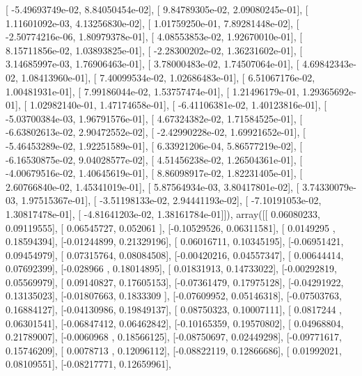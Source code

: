 \documentclass{article}
\begin{document}
       [ -5.49693749e-02,   8.84050454e-02],
       [  9.84789305e-02,   2.09080245e-01],
       [  1.11601092e-03,   4.13256830e-02],
       [  1.01759250e-01,   7.89281448e-02],
       [ -2.50774216e-06,   1.80979378e-01],
       [  4.08553853e-02,   1.92670010e-01],
       [  8.15711856e-02,   1.03893825e-01],
       [ -2.28300202e-02,   1.36231602e-01],
       [  3.14685997e-03,   1.76906463e-01],
       [  3.78000483e-02,   1.74507064e-01],
       [  4.69842343e-02,   1.08413960e-01],
       [  7.40099534e-02,   1.02686483e-01],
       [  6.51067176e-02,   1.00481931e-01],
       [  7.99186044e-02,   1.53757474e-01],
       [  1.21496179e-01,   1.29365692e-01],
       [  1.02982140e-01,   1.47174658e-01],
       [ -6.41106381e-02,   1.40123816e-01],
       [ -5.03700384e-03,   1.96791576e-01],
       [  4.67324382e-02,   1.71584525e-01],
       [ -6.63802613e-02,   2.90472552e-02],
       [ -2.42990228e-02,   1.69921652e-01],
       [ -5.46453289e-02,   1.92251589e-01],
       [  6.33921206e-04,   5.86577219e-02],
       [ -6.16530875e-02,   9.04028577e-02],
       [  4.51456238e-02,   1.26504361e-01],
       [ -4.00679516e-02,   1.40645619e-01],
       [  8.86098917e-02,   1.82231405e-01],
       [  2.60766840e-02,   1.45341019e-01],
       [  5.87564934e-03,   3.80417801e-02],
       [  3.74330079e-03,   1.97515367e-01],
       [ -3.51198133e-02,   2.94441193e-02],
       [ -7.10191053e-02,   1.30817478e-01],
       [ -4.81641203e-02,   1.38161784e-01]]), array([[ 0.06080233,  0.09119555],
       [ 0.06545727,  0.052061  ],
       [-0.10529526,  0.06311581],
       [ 0.0149295 ,  0.18594394],
       [-0.01244899,  0.21329196],
       [ 0.06016711,  0.10345195],
       [-0.06951421,  0.09454979],
       [ 0.07315764,  0.08084508],
       [-0.00420216,  0.04557347],
       [ 0.00644414,  0.07692399],
       [-0.028966  ,  0.18014895],
       [ 0.01831913,  0.14733022],
       [-0.00292819,  0.05569979],
       [ 0.09140827,  0.17605153],
       [-0.07361479,  0.17975128],
       [-0.04291922,  0.13135023],
       [-0.01807663,  0.1833309 ],
       [-0.07609952,  0.05146318],
       [-0.07503763,  0.16884127],
       [-0.04130986,  0.19849137],
       [ 0.08750323,  0.10007111],
       [ 0.0817244 ,  0.06301541],
       [-0.06847412,  0.06462842],
       [-0.10165359,  0.19570802],
       [ 0.04968804,  0.21789007],
       [-0.0060968 ,  0.18566125],
       [-0.08750697,  0.02449298],
       [-0.09771617,  0.15746209],
       [ 0.0078713 ,  0.12096112],
       [-0.08822119,  0.12866686],
       [ 0.01992021,  0.08109551],
       [-0.08217771,  0.12659961],
\end{document}
